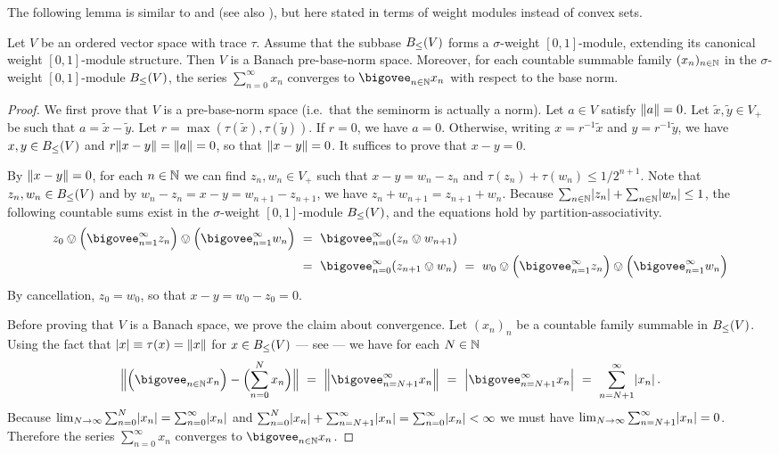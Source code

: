 \documentclass[%
	submission,
copyright,creativecommons,UKenglish]{eptcs}
\begin{document}
The following lemma is similar to
\cite[Proposition~2.4.11 and Lemma 2.4.12]{Furber2017}
and \cite[Corollary~2]{BoergerK1996} (see also \cite{EdwardsG1970}),
but here stated in terms of weight modules
instead of convex sets.

\begin{lemma}
\label{lem:bbns-if-subbase-sigma-wmod}
Let $V$ be an ordered vector space with trace $\tau$.
Assume that the subbase $B_{\le}(V)$
forms a $\sigma$-weight $[0,1]$-module,
extending its canonical weight $[0,1]$-module structure.
Then $V$ is a Banach pre-base-norm space.
Moreover, for each countable summable family $(x_n)_{n\in\mathbb{N}}$ in
the $\sigma$-weight $[0,1]$-module $B_{\le}(V)$,
the series $\sum_{n=0}^{\infty} x_n$ converges to
$\bigovee_{n\in\N} x_n$ with respect to the base norm.
\end{lemma}
\begin{proof}
We first prove that $V$ is a pre-base-norm space (i.e.\ that the seminorm is actually a norm).
Let $a\in V$ satisfy $\norm{a}=0$.
Let $\tilde{x},\tilde{y}\in V_+$ be such that $a=\tilde{x}-\tilde{y}$.
Let $r= \max(\tau(\tilde{x}),\tau(\tilde{y}))$.
If $r=0$, we have $a=0$.
Otherwise,
writing $x=r^{-1}\tilde{x}$ and $y=r^{-1}\tilde{y}$,
we have $x,y\in B_{\le}(V)$ and $r\norm{x-y}=\norm{a}=0$,
so that $\norm{x-y}=0$.
It suffices to prove that $x-y=0$.

By $\norm{x-y}=0$, for each $n\in\mathbb{N}$
we can find $z_n,w_n\in V_+$ such that
$x-y=w_n-z_n$
and $\tau(z_n)+\tau(w_n)\le 1/2^{n+1}$.
Note that $z_n,w_n\in B_{\le}(V)$
and by $w_n-z_n=x-y=w_{n+1}-z_{n+1}$,
we have $z_n + w_{n+1}=z_{n+1} + w_n$.
Because $\sum_{n\in\mathbb{N}}\lvert z_n\rvert+\sum_{n\in\mathbb{N}}\lvert w_n\rvert\le 1$,
the following countable sums exist
in the $\sigma$-weight $[0,1]$-module $B_{\le}(V)$,
and the equations hold by partition-associativity.
\begin{align*}
z_0\ovee
\qty\Big(\bigovee_{n=1}^{\infty} z_n)
\ovee \qty\Big(\bigovee_{n=1}^{\infty} w_n)
&\ =\ 
\bigovee_{n=0}^{\infty}
(z_n\ovee w_{n+1})
\\
&\ =\ 
\bigovee_{n=0}^{\infty}
(z_{n+1}\ovee w_{n})
\ =\ 
w_0\ovee
\qty\Big(\bigovee_{n=1}^{\infty} z_n)
\ovee \qty\Big(\bigovee_{n=1}^{\infty} w_n)
\end{align*}
By cancellation, $z_0=w_0$, so that $x-y=w_0-z_0=0$.

Before proving that $V$ is a Banach space,
we prove the claim about convergence.
Let $(x_n)_n$ be
a countable family summable in $B_{\le}(V)$.
Using the fact that $\lvert x\rvert\equiv\tau(x)=\norm{x}$
for $x\in B_{\le}(V)$ --- see
\cite[Corollary 2.2.5]{Furber2017} ---
we have for each $N\in\mathbb{N}$
\[
\norm\Big{
\qty\Big(\bigovee_{n\in\N} x_n)
-
\qty\Big(\sum_{n=0}^N x_n)}
\ =\ 
\norm\Big{
\bigovee_{n=N+1}^{\infty} x_n}
\ =\ 
\weight[\Big]{
\bigovee_{n=N+1}^{\infty} x_n}
\ =\ 
\sum_{n=N+1}^{\infty} \weight{x_n}
\mpunct.
\]
Because
$\lim_{N\to\infty}\sum_{n=0}^{N} \lvert x_n\rvert= \sum_{n=0}^{\infty} \lvert x_n\rvert$
and $\sum_{n=0}^{N} \lvert x_n\rvert+
\sum_{n=N+1}^{\infty} \lvert x_n\rvert=\sum_{n=0}^{\infty} \lvert x_n\rvert<\infty$
we must have\linebreak
$\lim_{N\to\infty}\sum_{n=N+1}^{\infty} \lvert x_n\rvert= 0$.
Therefore the series $\sum_{n=0}^{\infty} x_n$ converges to $\bigovee_{n\in\N} x_n$.


\end{proof}
\end{document}
